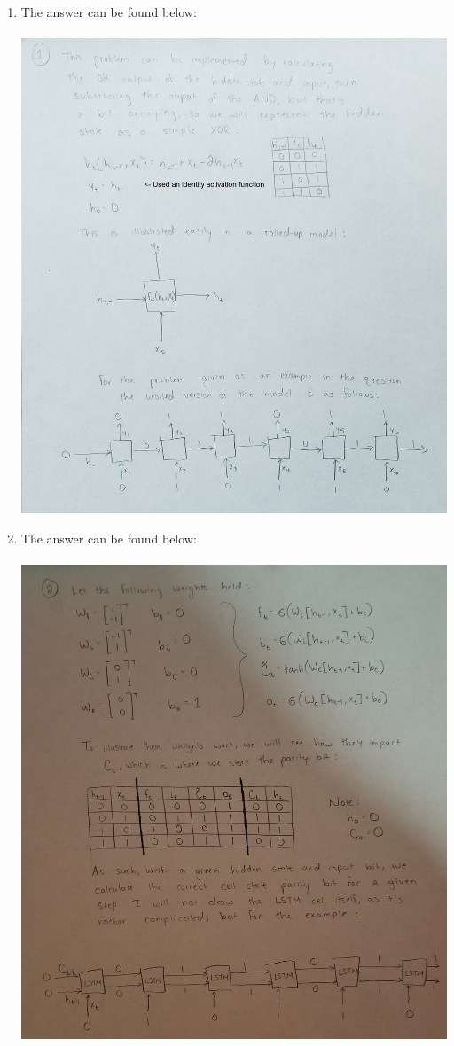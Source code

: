 \documentclass[11pt,english]{article}
\begin{document}
\begin{enumerate}
	\item The answer can be found below: \\\\
	\includegraphics[scale=0.15]{1-1.jpg} \pagebreak
	\item The answer can be found below: \\\\
	\includegraphics[scale=0.15]{1-2.jpg} \pagebreak

\end{enumerate}
\end{document}
